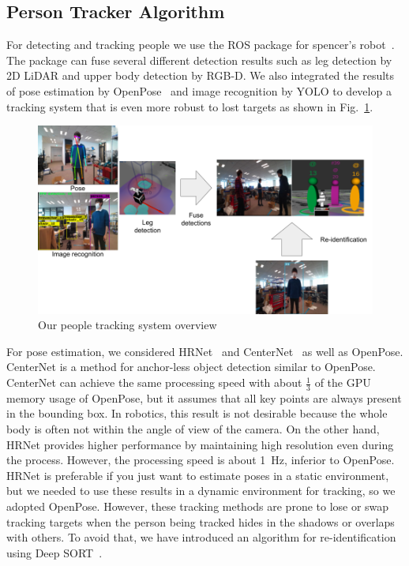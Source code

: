 \documentclass[runningheads,a4paper]{llncs}
\begin{document}
\subsection{Person Tracker Algorithm}
For detecting and tracking people we use the ROS package for spencer's robot~\cite{Linder2016}.
The package can fuse several different detection results such as leg detection by 2D LiDAR and upper body detection by RGB-D.
We also integrated the results of pose estimation by OpenPose~\cite{Cao2019} and image recognition by YOLO to develop a tracking system that is even more robust to lost targets as shown in Fig.~\ref{fig:track_people}.
\begin{figure}[tbp]
    \centering
    \includegraphics[width=0.8\linewidth]{images/people_track.png}
    \caption{Our people tracking system overview}
    \label{fig:track_people}
\end{figure}
For pose estimation, we considered HRNet~\cite{sun2019deep} and CenterNet~\cite{zhou2019objects} as well as OpenPose.
CenterNet is a method for anchor-less object detection similar to OpenPose.
CenterNet can achieve the same processing speed with about $\frac{1}{3}$ of the GPU memory usage of OpenPose, but it assumes that all key points are always present in the bounding box.
In robotics, this result is not desirable because the whole body is often not within the angle of view of the camera.
On the other hand, HRNet provides higher performance by maintaining high resolution even during the process.
However, the processing speed is about 1~Hz, inferior to OpenPose.
HRNet is preferable if you just want to estimate poses in a static environment, but we needed to use these results in a dynamic environment for tracking, so we adopted OpenPose.
However, these tracking methods are prone to lose or swap tracking targets when the person being tracked hides in the shadows or overlaps with others.
To avoid that, we have introduced an algorithm for re-identification using Deep SORT~\cite{Wojke2018deep}.
\end{document}
